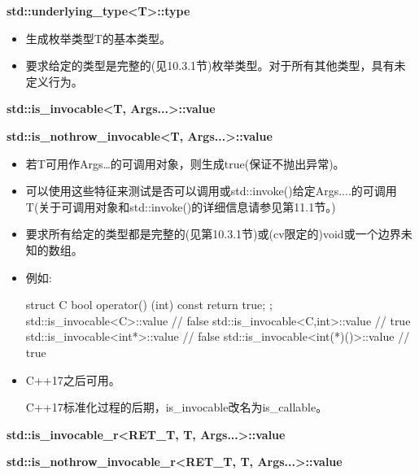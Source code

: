 \textbf{std::underlying\_type<T>::type}

\begin{itemize}
\item 
生成枚举类型T的基本类型。

\item 
要求给定的类型是完整的(见10.3.1节)枚举类型。对于所有其他类型，具有未定义行为。
\end{itemize}

\textbf{std::is\_invocable<T, Args...>::value}

\textbf{std::is\_nothrow\_invocable<T, Args...>::value}

\begin{itemize}
\item 
若T可用作Args…的可调用对象，则生成true(保证不抛出异常)。

\item 
可以使用这些特征来测试是否可以调用或std::invoke()给定Args....的可调用T(关于可调用对象和std::invoke()的详细信息请参见第11.1节。)

\item 
要求所有给定的类型都是完整的(见第10.3.1节)或(cv限定的)void或一个边界未知的数组。

\item 
例如:
\begin{cpp}
struct C {
	bool operator() (int) const {
		return true;
	}
};
std::is_invocable<C>::value // false
std::is_invocable<C,int>::value // true
std::is_invocable<int*>::value // false
std::is_invocable<int(*)()>::value // true
\end{cpp}

\item 
C++17之后可用。

\begin{notice}C++17标准化过程的后期，is\_invocable改名为is\_callable。
\end{notice}
\end{itemize}

\textbf{std::is\_invocable\_r<RET\_T, T, Args...>::value}

\textbf{std::is\_nothrow\_invocable\_r<RET\_T, T, Args...>::value}

